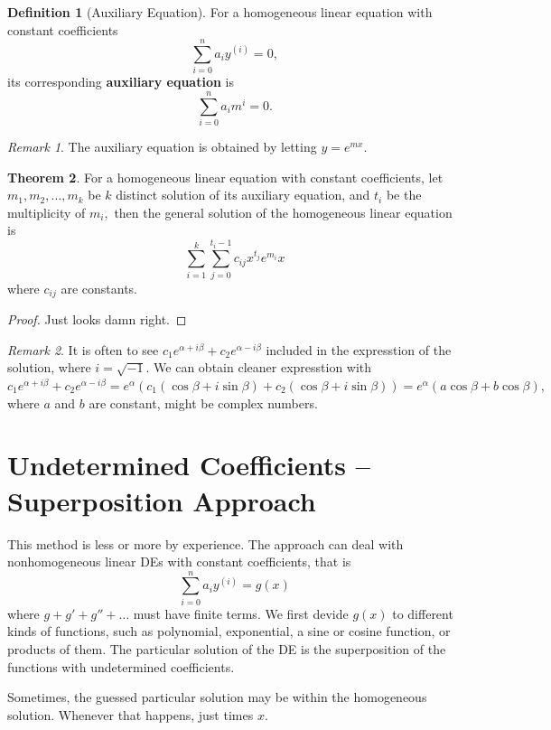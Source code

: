 \documentclass[12pt,a4paper]{report}
\theoremstyle{definition}
\newtheorem{theorem}{Theorem}[section]
\newtheorem{definition}[theorem]{Definition}
\theoremstyle{remark}
\newtheorem*{remark}{Remark}
\begin{document}
\begin{definition}[Auxiliary Equation]
    For a homogeneous linear equation with constant coefficients
    \[\sum_{i = 0}^{n} a_iy^{(i)} = 0,\]
    its corresponding \textbf{auxiliary equation} is
    \[\sum_{i = 0}^{n} a_i m^i = 0.\]
\end{definition}

\begin{remark}
    The auxiliary equation is obtained by letting $y = e^{mx}.$
\end{remark}

\begin{theorem}
    For a homogeneous linear equation with constant coefficients, let $m_1, m_2,\ldots, m_k$ be $k$ distinct solution of its auxiliary equation, and $t_i$ be the multiplicity of $m_i,$ then the general solution of the homogeneous linear equation is
    \[\sum_{i = 1}^{k} \sum_{j = 0}^{t_i - 1} c_{ij}x^{t_j} e^{m_i}x\]
    where $c_{ij}$ are constants.
\end{theorem}

\begin{proof}
    Just looks damn right.
\end{proof}

\begin{remark}
    It is often to see $c_1e^{\alpha + i\beta} + c_2e^{\alpha - i\beta}$ included in the expresstion of the solution, where $i = \sqrt{-1}.$ We can obtain cleaner expresstion with $c_1e^{\alpha + i\beta} + c_2e^{\alpha - i\beta} = e^\alpha(c_1 (\cos \beta + i \sin \beta) + c_2 (\cos \beta + i \sin \beta)) = e^\alpha(a \cos \beta + b \cos \beta),$ where $a$ and $b$ are constant, might be complex numbers.
\end{remark}

\section{Undetermined Coefficients -- Superposition Approach}

This method is less or more by experience. The approach can deal with nonhomogeneous linear DEs with constant coefficients, that is
\[\sum_{i = 0}^{n} a_iy^{(i)} = g(x)\]
where $g + g' + g'' +\ldots$ must have finite terms. We first devide $g(x)$ to different kinds of functions, such as polynomial, exponential, a sine or cosine function, or products of them. The particular solution of the DE is the superposition of the functions with undetermined coefficients.   

Sometimes, the guessed particular solution may be within the homogeneous solution. Whenever that happens, just times $x$.
\end{document}
